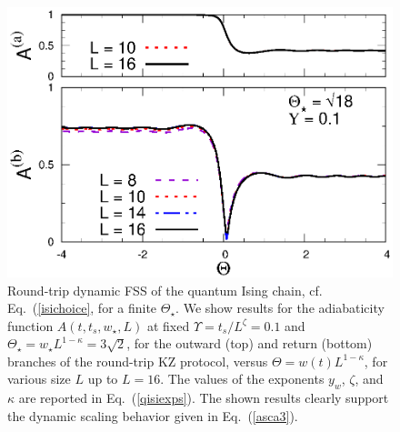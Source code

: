 \begin{figure}[!htb]
\centering
\includegraphics[width=0.65\columnwidth]{imm/headIQMY01ThA.eps}
\caption{ Round-trip dynamic FSS of the quantum Ising chain,
  cf. Eq.~(\ref{isichoice}, for a finite $\Theta_\star$.  We show
  results for the adiabaticity function $A(t,t_s,w_\star,L)$ at fixed
  $\Upsilon = t_s/L^\zeta= 0.1$ and $\Theta_\star = w_\star
  L^{1-\kappa}=3\sqrt{2}$, for the outward (top) and return (bottom)
  branches of the round-trip KZ protocol, versus
  $\Theta=w(t)L^{1-\kappa}$, for various size $L$ up to $L=16$.  The
  values of the exponents $y_w$, $\zeta$, and $\kappa$ are reported in
  Eq.~(\ref{qisiexps}).  The shown results clearly support the dynamic
  scaling behavior given in Eq.~(\ref{asca3}).  }
    \label{roundtripA}
\end{figure}


